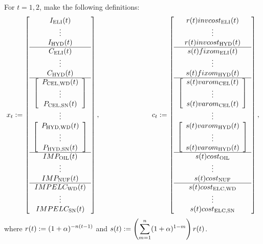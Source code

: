 For $t=1,2$, make the following definitions:
\[
x_t := \left[\begin{array}{c}I_{\text{ELI}}(t)\\ \vdots \\ I_{\text{HYD}}(t) \\ 
\hline C_{\text{ELI}}(t) \\ \vdots \\ C_{\text{HYD}}(t)\\ \hline \left[\begin{array}{c}
P_{\text{CEL,WD}}(t)\\ \vdots \\ P_{\text{CEL,SN}}(t)\end{array}\right]\\ \vdots\\
\left[\begin{array}{c}P_{\text{HYD,WD}}(t)\\ \vdots \\ P_{\text{HYD,SN}}(t)\end{array}\right]\\
\hline IMP_{\text{OIL}}(t)\\ \vdots \\ IMP_{\text{NUF}}(t)\\ 
\hline IMPELC_{\text{WD}}(t)\\ \vdots \\ IMPELC_{\text{SN}}(t)\end{array}\right], \hspace{1in}
c_t := \left[\begin{array}{c}r(t) invcost_{\text{ELI}}(t) \\ \vdots \\ r(t) invcost_{\text{HYD}}(t) \\ 
\hline s(t) fixom_{\text{ELI}}(t)\\ \vdots\\ s(t) fixom_{\text{HYD}}(t)\\
\hline \left[\begin{array}{c}s(t) varom_{\text{CEL}}(t)\\ \vdots\\ s(t) varom_{\text{CEL}}(t)\end{array}\right]\\ \vdots\\ \left[\begin{array}{c}s(t) varom_{\text{HYD}}(t)\\ \vdots\\ s(t) varom_{\text{HYD}}(t)\end{array}\right]\\
\hline s(t) cost_{\text{OIL}} \\ \vdots\\ s(t) cost_{\text{NUF}}\\
\hline s(t) cost_{\text{ELC,WD}} \\ \vdots\\ s(t) cost_{\text{ELC,SN}}\end{array}\right],
\]
where $\displaystyle r(t):= (1+\alpha)^{-n(t-1)}$ and $\displaystyle s(t):= \left(\sum_{m=1}^n (1+\alpha)^{1-m}\right)r(t)$.


